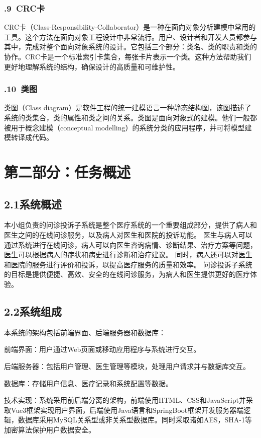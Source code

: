 \documentclass[24pt,a4paper]{article}%
\begin{document}
\subsubsection*{.9\ CRC卡}
CRC卡（Class-Responsibility-Collaborator）是一种在面向对象分析建模中常用的工具。这个方法在面向对象工程设计中非常流行。用户、设计者和开发人员都参与其中，完成对整个面向对象系统的设计。它包括三个部分：类名、类的职责和类的协作。CRC卡是一个标准索引卡集合，每张卡片表示一个类。这种方法帮助我们更好地理解系统的结构，确保设计的高质量和可维护性。
\subsubsection*{.10\ 类图}
类图（Class diagram）是软件工程的统一建模语言一种静态结构图，该图描述了系统的类集合，类的属性和类之间的关系。类图是面向对象式的建模。他们一般都被用于概念建模（conceptual modelling）的系统分类的应用程序，并可将模型建模转译成代码。

\newpage

\section*{\songti 第二部分：任务概述}
\subsection*{\songti 2.1系统概述}
本小组负责的问诊投诉子系统是整个医疗系统的一个重要组成部分，提供了病人和医生之间的在线问诊服务，以及病人对医生和医院的投诉功能。
医生与病人可以通过系统进行在线问诊，病人可以向医生咨询病情、诊断结果、治疗方案等问题，医生可以根据病人的症状和病史进行诊断和治疗建议。
同时，病人还可以对医生和医院的服务进行评价和投诉，以提高医疗服务的质量和效率。
问诊投诉子系统的目标是提供便捷、高效、安全的在线问诊服务，为病人和医生提供更好的医疗体验。
\subsection*{\songti 2.2系统组成}
本系统的架构包括前端界面、后端服务器和数据库：\par \noindent 前端界面：用户通过Web页面或移动应用程序与系统进行交互。\par \noindent 后端服务器：包括用户管理、医生管理等模块，处理用户请求并与数据库交互。\par \noindent 数据库：存储用户信息、医疗记录和系统配置等数据。\par
技术实现：系统采用前后端分离的架构，前端使用HTML、CSS和JavaScript并采取Vue3框架实现用户界面，后端使用Java语言和SpringBoot框架开发服务器端逻辑，数据库采用MySQL关系型或非关系型数据库。同时采取诸如AES，SHA-1等加密算法保护用户数据安全。
\end{document}
